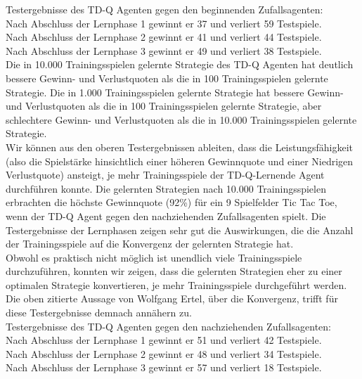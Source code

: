 Testergebnisse des TD-Q Agenten gegen den beginnenden Zufallsagenten: \\
Nach Abschluss der Lernphase 1 gewinnt er 37 und verliert 59 Testspiele. \\
Nach Abschluss der Lernphase 2 gewinnt er 41 und verliert 44 Testspiele. \\ 
Nach Abschluss der Lernphase 3 gewinnt er 49 und verliert 38 Testspiele. \\

Die in 10.000 Trainingsspielen gelernte Strategie des TD-Q Agenten hat deutlich bessere Gewinn- und Verlustquoten  als die in 100 Trainingsspielen gelernte Strategie. Die in 1.000 Trainingsspielen gelernte Strategie hat bessere Gewinn- und Verlustquoten als die in 100 Trainingsspielen gelernte Strategie, aber schlechtere Gewinn- und Verlustquoten als die in 10.000 Trainingsspielen gelernte Strategie.\\

Wir können aus den oberen Testergebnissen ableiten, dass die Leistungsfähigkeit (also die Spielstärke hinsichtlich einer höheren Gewinnquote und einer Niedrigen Verlustquote) ansteigt, je mehr Trainingsspiele der TD-Q-Lernende Agent durchführen konnte. Die gelernten Strategien nach 10.000 Trainingsspielen erbrachten die höchste Gewinnquote (92\%) für ein 9 Spielfelder Tic Tac Toe, wenn der TD-Q Agent gegen den nachziehenden Zufallsagenten spielt. Die Testergebnisse der Lernphasen zeigen sehr gut die Auswirkungen, die die Anzahl der Trainingsspiele auf die Konvergenz der gelernten Strategie hat. \\

Obwohl es praktisch nicht möglich ist unendlich viele Trainingsspiele durchzuführen, konnten wir zeigen, dass die gelernten Strategien eher zu einer optimalen Strategie konvertieren, je mehr Trainingsspiele durchgeführt werden. Die oben zitierte Aussage von Wolfgang Ertel, über die Konvergenz, trifft für diese Testergebnisse demnach annähern zu. \\

Testergebnisse des TD-Q Agenten gegen den nachziehenden Zufallsagenten: \\
Nach Abschluss der Lernphase 1 gewinnt er 51 und verliert 42 Testspiele. \\
Nach Abschluss der Lernphase 2 gewinnt er 48 und verliert 34 Testspiele. \\
Nach Abschluss der Lernphase 3 gewinnt er 57 und verliert 18 Testspiele. \\

